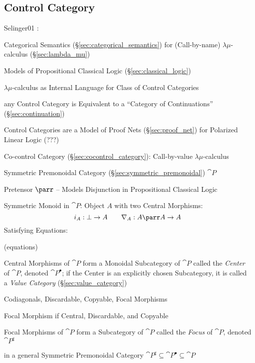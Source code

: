 \subsection{Control Category}\label{sec:control_category}

Selinger01 \cite{selinger01}:

Categorical Semantics (\S\ref{sec:categorical_semantics}) for
(Call-by-name) $\lambda\mu$-calculus (\S\ref{sec:lambda_mu})

Models of Propositional Classical Logic (\S\ref{sec:classical_logic})

$\lambda\mu$-calculus as Internal Language for Class of Control
Categories

any Control Category is Equivalent to a ``Category of Continuations''
(\S\ref{sec:continuation})

Control Categories are a Model of Proof Nets (\S\ref{sec:proof_net})
for Polarized Linear Logic (???) %


Co-control Category (\S\ref{sec:cocontrol_category}): Call-by-value
$\lambda\mu$-calculus


\asterism


Symmetric Premonoidal Category (\S\ref{sec:symmetric_premonoidal})
$\cat{P}$

Pretensor $\parr$ -- Models Disjunction in Propositional Classical
Logic

Symmetric Monoid in $\cat{P}$: Object $A$ with two Central Morphisms:
\[
  i_A : \bot \rightarrow A \quad\quad
  \nabla_A : A \parr A \rightarrow A
\]
Satisfying Equations:

(equations) %

Central Morphisms of $\cat{P}$ form a Monoidal Subcategory of
$\cat{P}$ called the \emph{Center} of $\cat{P}$, denoted
$\cat{P}^\bullet$; if the Center is an explicitly chosen Subcategory,
it is called a \emph{Value Category} (\S\ref{sec:value_category})

Codiagonals, Discardable, Copyable, Focal Morphisms %

Focal Morphism if Central, Discardable, and Copyable

Focal Morphisms of $\cat{P}$ form a Subcategory of $\cat{P}$ called
the \emph{Focus} of $\cat{P}$, denoted $\cat{P}^\sharp$

in a general Symmetric Premonoidal Category $\cat{P}^\sharp \subseteq
\cat{P}^\bullet \subseteq \cat{P}$

